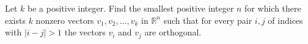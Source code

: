 Let $k$ be a positive integer. Find the smallest positive integer $n$ for which there exists $k$ nonzero vectors $v_1,v_2,…,v_k$ in $\mathbb{R}^n$ such that for every pair $i,j$ of indices with $|i-j|>1$ the vectors $v_i$ and $v_j$ are orthogonal.

